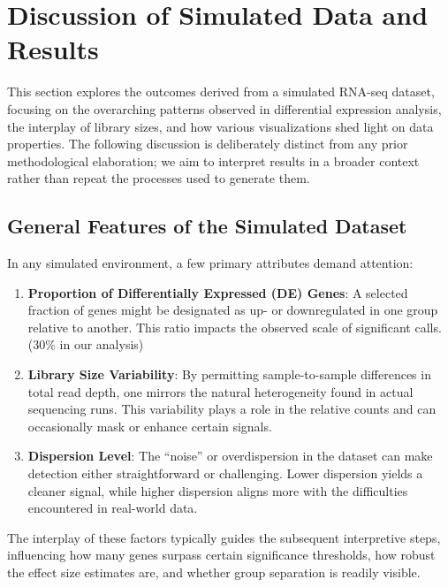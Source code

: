 \documentclass[12pt]{article}
\begin{document}
\section{Discussion of Simulated Data and Results}
\label{sec:discussion_results}

This section explores the outcomes derived from a simulated RNA-seq dataset, focusing on the overarching patterns observed in differential expression analysis, the interplay of library sizes, and how various visualizations shed light on data properties. The following discussion is deliberately distinct from any prior methodological elaboration; we aim to interpret results in a broader context rather than repeat the processes used to generate them.

\subsection{General Features of the Simulated Dataset}
In any simulated environment, a few primary attributes demand attention:

\begin{enumerate}
    \item \textbf{Proportion of Differentially Expressed (DE) Genes}: A selected fraction of genes might be designated as up- or downregulated in one group relative to another. This ratio impacts the observed scale of significant calls.(30\% in our analysis)
    \item \textbf{Library Size Variability}: By permitting sample-to-sample differences in total read depth, one mirrors the natural heterogeneity found in actual sequencing runs. This variability plays a role in the relative counts and can occasionally mask or enhance certain signals.
    \item \textbf{Dispersion Level}: The “noise” or overdispersion in the dataset can make detection either straightforward or challenging. Lower dispersion yields a cleaner signal, while higher dispersion aligns more with the difficulties encountered in real-world data.
\end{enumerate}

The interplay of these factors typically guides the subsequent interpretive steps, influencing how many genes surpass certain significance thresholds, how robust the effect size estimates are, and whether group separation is readily visible.
\end{document}
